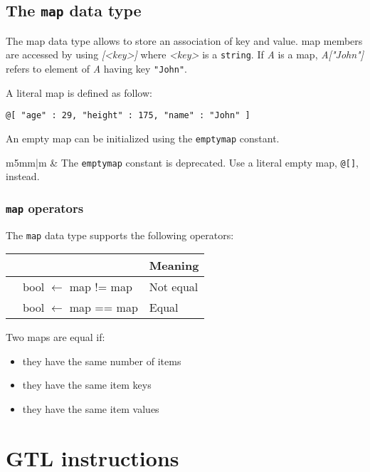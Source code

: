 \documentclass[11pt]{article}
\newcommand{\var}[1]{{\ttfamily\em #1}}
\newcommand\Warning{%
 \makebox[1.4em][c]{%
 \makebox[0pt][c]{\raisebox{.1em}{\small!}}%
 \makebox[0pt][c]{\color{red}\Large$\bigtriangleup$}}}%
\newcommand{\warning}[1]{%
\vspace{1em}
\hspace{-18.3mm}
\rowcolors{1}{white}{light-gray}
\begin{tabular}[b]{m{5mm}|m{\linewidth}}
\Warning & #1\\
\end{tabular}
}
\begin{document}
\subsection{The \lstinline{map} data type}

The map data type allows to store an association of key and value. map members are accessed by using \var{[<key>]} where \var{<key>} is a \texttt{string}. If \var{A} is a map, \var{A["John"]} refers to element of \var{A} having key \texttt{"John"}.

A literal map is defined as follow:

\begin{lstlisting}[language=goilTemplate]
@[ "age" : 29, "height" : 175, "name" : "John" ]
\end{lstlisting}

An empty map can be initialized using the \texttt{emptymap} constant.

\warning{The {\tt emptymap} constant is deprecated. Use a literal empty map, \texttt{@[]}, instead.}


\subsubsection{\lstinline{map} operators}

The \lstinline{map} data type supports the following operators:

\begin{longtable}{>{\ttfamily}l|>{\ttfamily}l|p{3.16in}}
{\bf Operator}&{\bf Expression type}&{\bf Meaning}\\
\hline\endhead
 {!=}&
  {bool $\leftarrow$ map != map}&
  {Not equal}\\
 {==}&
  {bool $\leftarrow$ map == map}&
  {Equal}\\
\end{longtable}

Two maps are equal if:
\begin{itemize}
\item they have the same number of items
\item they have the same item keys
\item they have the same item values
\end{itemize}



\section{GTL instructions}
\end{document}
